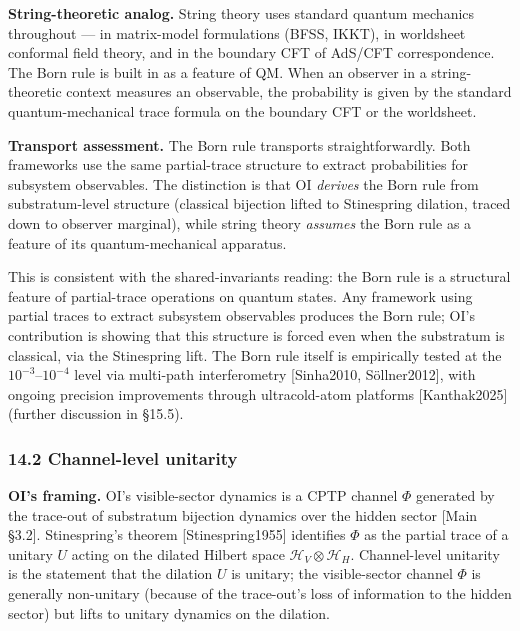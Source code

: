 \documentclass[
]{article}
\begin{document}
\textbf{String-theoretic analog.} String theory uses standard quantum
mechanics throughout --- in matrix-model formulations (BFSS, IKKT), in
worldsheet conformal field theory, and in the boundary CFT of AdS/CFT
correspondence. The Born rule is built in as a feature of QM. When an
observer in a string-theoretic context measures an observable, the
probability is given by the standard quantum-mechanical trace formula on
the boundary CFT or the worldsheet.

\textbf{Transport assessment.} The Born rule transports
straightforwardly. Both frameworks use the same partial-trace structure
to extract probabilities for subsystem observables. The distinction is
that OI \emph{derives} the Born rule from substratum-level structure
(classical bijection lifted to Stinespring dilation, traced down to
observer marginal), while string theory \emph{assumes} the Born rule as
a feature of its quantum-mechanical apparatus.

This is consistent with the shared-invariants reading: the Born rule is
a structural feature of partial-trace operations on quantum states. Any
framework using partial traces to extract subsystem observables produces
the Born rule; OI's contribution is showing that this structure is
forced even when the substratum is classical, via the Stinespring lift.
The Born rule itself is empirically tested at the
\(10^{-3}\)--\(10^{-4}\) level via multi-path interferometry
{[}Sinha2010, Söllner2012{]}, with ongoing precision improvements
through ultracold-atom platforms {[}Kanthak2025{]} (further discussion
in §15.5).

\hypertarget{channel-level-unitarity}{%
\subsubsection{14.2 Channel-level
unitarity}\label{channel-level-unitarity}}

\textbf{OI's framing.} OI's visible-sector dynamics is a CPTP channel
\(\Phi\) generated by the trace-out of substratum bijection dynamics
over the hidden sector {[}Main §3.2{]}. Stinespring's theorem
{[}Stinespring1955{]} identifies \(\Phi\) as the partial trace of a
unitary \(U\) acting on the dilated Hilbert space
\(\mathcal{H}_V \otimes \mathcal{H}_H\). Channel-level unitarity is the
statement that the dilation \(U\) is unitary; the visible-sector channel
\(\Phi\) is generally non-unitary (because of the trace-out's loss of
information to the hidden sector) but lifts to unitary dynamics on the
dilation.
\end{document}
